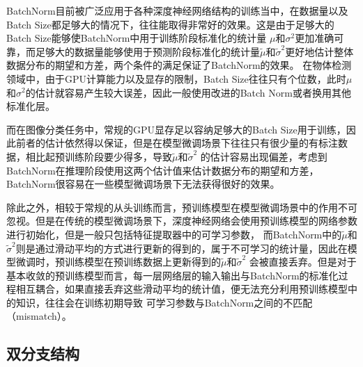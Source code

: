 BatchNorm目前被广泛应用于各种深度神经网络结构的训练当中，在数据量以及Batch Size都足够大的情况下，往往能取得非常好的效果。这是由于足够大的Batch Size能够使BatchNorm中用于训练阶段标准化的统计量
$\mu$和$\sigma^{2}$更加准确可靠，而足够大的数据量能够使用于预测阶段标准化的统计量$\tilde{\mu}$和$\tilde{\sigma}^{2}$更好地估计整体数据分布的期望和方差，两个条件的满足保证了BatchNorm的效果。
在物体检测领域中，由于GPU计算能力以及显存的限制，Batch Size往往只有个位数，此时$\mu$和$\sigma^{2}$的估计就容易产生较大误差，因此一般使用改进的Batch Norm或者换用其他标准化层。

而在图像分类任务中，常规的GPU显存足以容纳足够大的Batch Size用于训练，因此前者的估计依然得以保证，但是在模型微调场景下往往只有很少量的有标注数据，相比起预训练阶段要少得多，导致$\tilde{\mu}$和$\tilde{\sigma}^{2}$
的估计容易出现偏差，考虑到BatchNorm在推理阶段使用这两个估计值来估计数据分布的期望和方差，BatchNorm很容易在一些模型微调场景下无法获得很好的效果。

除此之外，相较于常规的从头训练而言，预训练模型在模型微调场景中的作用不可忽视。但是在传统的模型微调场景下，深度神经网络会使用预训练模型的网络参数进行初始化，但是一般只包括特征提取器中的可学习参数，
而BatchNorm中的$\tilde{\mu}$和$\tilde{\sigma}^{2}$则是通过滑动平均的方式进行更新的得到的，属于不可学习的统计量，因此在模型微调时，预训练模型在预训练数据上更新得到的$\tilde{\mu}$和$\tilde{\sigma}^{2}$
会被直接丢弃。但是对于基本收敛的预训练模型而言，每一层网络层的输入输出与BatchNorm的标准化过程相互耦合，如果直接丢弃这些滑动平均的统计值，便无法充分利用预训练模型中的知识，往往会在训练初期导致
可学习参数与BatchNorm之间的不匹配（mismatch）。



\subsection{双分支结构}


